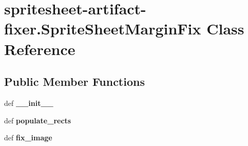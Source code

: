 \hypertarget{classspritesheet-artifact-fixer_1_1_sprite_sheet_margin_fix}{\section{spritesheet-\/artifact-\/fixer.Sprite\-Sheet\-Margin\-Fix Class Reference}
\label{classspritesheet-artifact-fixer_1_1_sprite_sheet_margin_fix}
}
\subsection*{Public Member Functions}
\begin{DoxyCompactItemize}
\item 
\hypertarget{classspritesheet-artifact-fixer_1_1_sprite_sheet_margin_fix_ac4c79e353031b51198b66691eeb37fe6}{def {\bfseries \-\_\-\-\_\-init\-\_\-\-\_\-}}\label{classspritesheet-artifact-fixer_1_1_sprite_sheet_margin_fix_ac4c79e353031b51198b66691eeb37fe6}

\item 
\hypertarget{classspritesheet-artifact-fixer_1_1_sprite_sheet_margin_fix_abd2409393d7b4906a3d9f3f59e73b7a9}{def {\bfseries populate\-\_\-rects}}\label{classspritesheet-artifact-fixer_1_1_sprite_sheet_margin_fix_abd2409393d7b4906a3d9f3f59e73b7a9}

\item 
\hypertarget{classspritesheet-artifact-fixer_1_1_sprite_sheet_margin_fix_a118572fb1ace6674af0c2ee188d2bea5}{def {\bfseries fix\-\_\-image}}\label{classspritesheet-artifact-fixer_1_1_sprite_sheet_margin_fix_a118572fb1ace6674af0c2ee188d2bea5}

\end{DoxyCompactItemize}
